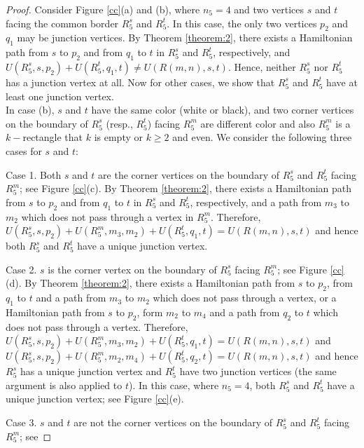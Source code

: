 \documentclass[preprint,12pt]{elsarticle}
\begin{document}
\begin{proof}
Consider Figure \ref{cc}(a) and (b), where $n_5=4$ and two vertices
$s$ and $t$ facing the common border $R^{s}_{5}$ and $R^{t}_{5}$. In
this case, the only two vertices $p_2$ and $q_1$ may be junction
vertices. By Theorem \ref{theorem:2}, there exists a Hamiltonian
path from $s$ to $p_2$ and from $q_1$ to $t$ in $R^{s}_{5}$ and
$R^{t}_{5}$, respectively, and
$U(R_{5}^{s},s,p_{2})+U(R_{5}^{t},q_{1},t)\neq U(R(m,n),s,t)$.
Hence, neither $R^{s}_{5}$ nor $R^{t}_{5}$ has a junction vertex at
all. Now for other cases, we show that $R^{s}_{5}$ and $R^{t}_{5}$
have at least one junction vertex.\\
In case (b), $s$ and $t$ have the same color (white or black), and
two corner vertices on the boundary of $R^{s}_{5}$ (resp.,
$R^{t}_{5}$) facing $R^{m}_{5}$ are different color and also
$R^{m}_{5}$ is a $k-$rectangle that $k$ is empty or $k\geq 2$ and
even. We consider the following three cases for $s$ and $t$:
\par Case 1. Both $s$ and $t$ are the corner vertices on the boundary
of $R^{s}_{5}$ and $R^{t}_{5}$ facing $R^{m}_{5}$; see Figure
\ref{cc}(c). By Theorem \ref{theorem:2}, there exists a Hamiltonian
path from $s$ to $p_{2}$ and from $q_{1}$ to $t$ in $R^{s}_{5}$ and
$R^{t}_{5}$, respectively, and a path from $m_{3}$ to $m_{2}$ which does not pass through a vertex in $R^{m}_{5}$. Therefore,
$U(R_{5}^{s},s,p_{2})+U(R_{5}^{m},m_{3},m_{2})+U(R_{5}^{t},q_{1},t)=U(R(m,n),s,t)$
and hence both $R^{s}_5$ and $R^{t}_5$ have a unique junction
vertex.
\par Case
2. $s$ is the corner vertex on the boundary of $R^{s}_{5}$ facing
$R^{m}_{5}$; see Figure \ref{cc}(d). By Theorem \ref{theorem:2},
there exists a Hamiltonian path from $s$ to $p_{2}$, from $q_{1}$ to
$t$ and a path from $m_3$ to $m_2$ which does not pass through a
vertex, or  a Hamiltonian path from $s$ to $p_{2}$, form  $m_{2}$ to $m_{4}$ and a path
from $q_{2}$ to $t$ which does not pass through a vertex. Therefore,
$U(R_{5}^{s},s,p_{2})+U(R_{5}^{m},m_{3},m_{2})+U(R_{5}^{t},q_{1},t)=U(R(m,n),s,t)$
and
$U(R_{5}^{s},s,p_{2})+U(R_{5}^{m},m_{2},m_{4})+U(R_{5}^{t},q_{2},t)=U(R(m,n),s,t)$
and hence $R^{s}_5$ has a unique junction vertex and $R^{t}_5$ have
two junction vertices (the same argument is also applied to $t$). In
this case, where $n_5=4$, both $R^{s}_5$ and $R^{t}_5$ have a unique
junction vertex; see Figure \ref{cc}(e).
\par Case 3. $s$ and $t$ are not the corner vertices on the
boundary of $R^{s}_{5}$ and $R^{t}_{5}$ facing $R^{m}_{5}$; see

\end{proof}
\end{document}
